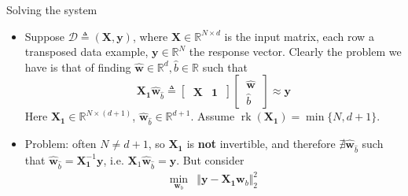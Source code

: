 \documentclass{beamer}
\numberwithin{equation}{section}
\begin{document}
\begin{frame}{Solving the system}
    \begin{itemize}
        \item
        Suppose $ \mathcal{D} \triangleq (\mathbf{X}, \mathbf{y}) $, where
        $ \mathbf{X} \in \mathbb{R}^{N \times d} $ is the input matrix, each
        row a transposed data example, $ \mathbf{y} \in \mathbb{R}^N $ the
        response vector. Clearly the problem we have is that of finding
        $ \hat{\mathbf{w}} \in \mathbb{R}^d , \hat{b} \in \mathbb{R} $
        such that
        \begin{equation*}
            \mathbf{X}_\mathbf{1}\hat{\mathbf{w}}_{\hat{b}} \triangleq
            \begin{bmatrix}
                \ \mathbf{X} & \mathbf{1} \
            \end{bmatrix}
            \begin{bmatrix}
                \ \hat{\mathbf{w}} \ \\ \ \hat{b} \
            \end{bmatrix} \approx \mathbf{y}
        \end{equation*}
        Here $ \mathbf{X}_\mathbf{1} \in \mathbb{R}^{N \times (d + 1)} $,
        $ \hat{\mathbf{w}}_{\hat{b}} \in \mathbb{R}^{d + 1} $. Assume
        $ \operatorname{rk}(\mathbf{X}_\mathbf{1}) = \min\{N, d + 1\} $.

        \item
        Problem: often $ N \ne d + 1 $, so $ \mathbf{X}_\mathbf{1} $ is
        \textbf{not} invertible, and therefore $ \nexists
        \hat{\mathbf{w}}_{\hat{b}} $ such that $ \hat{\mathbf{w}}_{\hat{b}} =
        \mathbf{X}_\mathbf{1}^{-1}\mathbf{y} $, i.e. $ \mathbf{X}_1
        \hat{\mathbf{w}}_{\hat{b}} = \mathbf{y} $. But consider
        \begin{equation} \label{lr_2norm_aug}
            \begin{array}{ll}
                \displaystyle\min_{\mathbf{w}_b} &
                \Vert\mathbf{y} - \mathbf{X}_\mathbf{1}\mathbf{w}_b\Vert_2^2
            \end{array}
        \end{equation}
    \end{itemize}
\end{frame}
\end{document}

